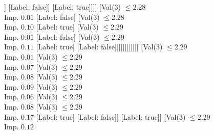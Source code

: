 \documentclass[margin=10pt]{standalone}
\begin{document}
\begin{forest}
												[Val($3$) $ \leq 2.27$ \\ Imp. $0.01$
													[Label: false]
													[Val($3$) $ \leq 2.27$ \\ Imp. $0.05$
														[Label: true]
														[Val($3$) $ \leq 2.27$ \\ Imp. $0.01$
															[Label: false]
															[Val($3$) $ \leq 2.27$ \\ Imp. $0.03$
																[Label: true]
																[Val($3$) $ \leq 2.28$ \\ Imp. $0.01$
																	[Val($3$) $ \leq 2.27$ \\ Imp. $0.10$
																		[Label: false]
																		[Val($3$) $ \leq 2.27$ \\ Imp. $0.08$
																			[Label: true]
																			[Val($3$) $ \leq 2.28$ \\ Imp. $0.11$
																				[Val($3$) $ \leq 2.28$ \\ Imp. $0.12$
																					[Val($3$) $ \leq 2.27$ \\ Imp. $0.50$
																						[Label: false]
																						[Label: true]]
																					[Label: false]]
																				[Label: true]]]]
																	[Val($3$) $ \leq 2.28$ \\ Imp. $0.01$
																		[Label: false]
																		[Val($3$) $ \leq 2.28$ \\ Imp. $0.10$
																			[Label: true]
																			[Val($3$) $ \leq 2.29$ \\ Imp. $0.01$
																				[Label: false]
																				[Val($3$) $ \leq 2.29$ \\ Imp. $0.11$
																					[Label: true]
																					[Label: false]]]]]]]]]]]]
										[Val($3$) $ \leq 2.29$ \\ Imp. $0.01$
											[Val($3$) $ \leq 2.29$ \\ Imp. $0.07$
												[Val($3$) $ \leq 2.29$ \\ Imp. $0.08$
													[Val($3$) $ \leq 2.29$ \\ Imp. $0.09$
														[Val($3$) $ \leq 2.29$ \\ Imp. $0.06$
															[Val($3$) $ \leq 2.29$ \\ Imp. $0.08$
																[Val($3$) $ \leq 2.29$ \\ Imp. $0.17$
																	[Label: true]
																	[Label: false]]
																[Label: true]]
															[Val($3$) $ \leq 2.29$ \\ Imp. $0.12$

\end{forest}
\end{document}
